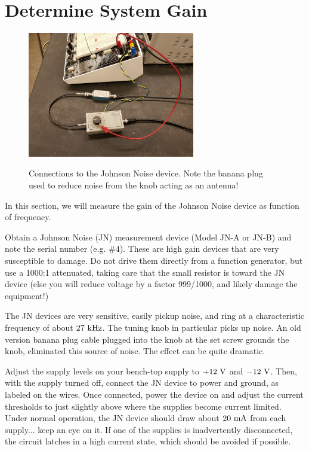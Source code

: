 \documentclass[12pt]{article}
\begin{document}
\section{Determine System Gain}

\begin{figure}[htbp]
\begin{center}
{\includegraphics[width=0.65\textwidth]{figs/jn_setup.jpg}}
\end{center}
\caption{\label{fig:plan} Connections to the Johnson Noise device.  Note the banana plug used to reduce noise from the knob acting as an antenna!}
\end{figure}

In this section, we will measure the gain of the Johnson Noise device as function of frequency.

Obtain a Johnson Noise (JN) measurement device (Model JN-A or JN-B) and note the serial number (e.g. \#4).  These are high gain devices that are very susceptible to damage.  Do not drive them directly from a function generator, but use a 1000:1 attenuated, taking care that the small resistor is toward the JN device (else you will reduce voltage by a factor 999/1000, and likely damage the equipment!)  

The JN devices are very sensitive, easily pickup noise, and ring at a characteristic frequency of about $27~{\rm kHz}$.  The tuning knob in particular picks up noise.  An old version banana plug cable plugged into the knob at the set screw grounds the knob, eliminated this source of noise.  The effect can be quite dramatic. 

Adjust the supply levels on your bench-top supply to $+12~{\rm V}$ and $-12~{\rm V}$.  Then, with the supply turned off, connect the JN device to power and ground, as labeled on the wires.  Once connected, power the device on and adjust the current thresholds to just slightly above where the supplies become current limited.  Under normal operation, the JN device should draw about $20~\rm mA$ from each supply... keep an eye on it.  If one of the supplies is inadvertently disconnected, the circuit latches in a high current state, which should be avoided if possible.
\end{document}
